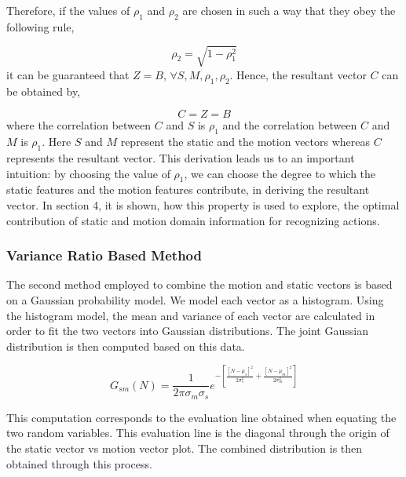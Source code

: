 Therefore, if the values of $\rho_{1}$ and $\rho_{2}$ are chosen in such a way that they obey the following
rule,

\begin{equation}
\rho_{2} = \sqrt{1-\rho_{1}^2}
\end{equation}
it can be guaranteed that $Z = B$, $\forall S,M,\rho_{1},\rho_{2}$. Hence, the resultant vector $C$ can be obtained
by,

\begin{equation}
C=Z=B
\end{equation}
where the correlation between $C$ and $S$ is $\rho_{1}$ and the correlation between $C$ and $M$ is $\rho_{1}$. Here $S$ and $M$ represent the static and the
motion vectors whereas $C$ represents the resultant vector. This derivation
leads us to an important intuition: by choosing the value of $\rho_{1}$, we can
choose the degree to which the static features and the motion features contribute,
in deriving the resultant vector. In section 4, it is shown, how this property is used to explore, the optimal contribution of
static and motion domain information for recognizing actions.

\subsubsection{Variance Ratio Based Method}

The second method employed to combine the motion and static vectors is based on a Gaussian probability model. We model each vector as a histogram. %
Using the histogram model, the mean and variance of each vector are calculated in order to fit the two vectors into Gaussian distributions. The joint Gaussian distribution is then computed based on this data.

\begin{equation}
G_{sm}(N)= \frac{1}{2\pi\sigma_m\sigma_s} e^{-\left[\frac{[N-\mu_s]^2}{2\sigma_s^2}+ \frac{[N-\mu_m]^2}{2\sigma_m^2} \right]}
\end{equation}

This computation corresponds to the evaluation line obtained when equating the two random variables. This evaluation line is the diagonal through the origin of the static vector vs motion vector plot. The combined distribution is then obtained through this process.

